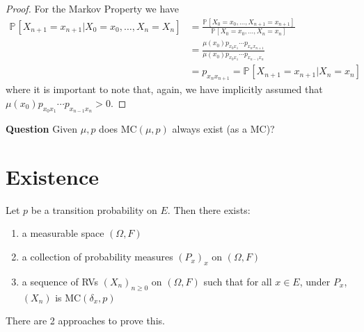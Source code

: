 \begin{proof}
For the Markov Property we have
\begin{align}
	\mathbb{P}_{} \left[ X_{n+1} = x_{n+1} | X_0 =x_0, \ldots ,X_n=X_n \right] &=
		\frac{\mathbb{P}_{} \left[ X_0=x_0, \ldots , X_{n+1}=x_{n+1} \right] }
		{\mathbb{P}_{} \left[ X_0=x_0 , \ldots , X_{n}=x_{n} \right]} \\
	&= \frac{\mu(x_0)p_{x_0 x_1}  \cdots  p_{x_{n}x_{n+1}}} {\mu(x_0)p_{x_0x_1} \cdots p_{x_{n-1}x_{n}}} \\
	&= p_{x_n x_{n+1}} = \mathbb{P}_{} \left[ X_{n+1} = x_{n+1} | X_n=x_n \right] 
\end{align}
where it is important to note that, again,  we have implicitly assumed that \newline $\mu(x_0)p_{x_0x_1} \cdots p_{x_{n-1}x_n}>0$. 

\end{proof}


\textbf{Question} Given $\mu, p$ does $ \textrm{MC}(\mu, p)$ always exist (as a MC)?

\section{Existence}

\begin{theorem}
	Let $p$ be a transition probability on $E$. Then there exists:
\begin{enumerate}
	\item a measurable space $(\Omega, F)$
	\item a collection of probability measures $(P_x)_{x}$ on $(\Omega, F)$
	\item a sequence of RVs $(X_n)_{n \geq 0}$ on $(\Omega, F)$ such that for all $x\in E$, under $P_x$, $(X_n)$ is  $ \textrm{MC}(\delta_x, p)$
\end{enumerate}

\end{theorem}

There are 2 approaches to prove this. 

